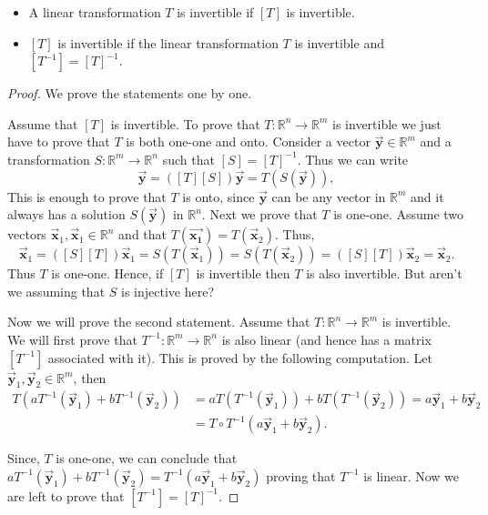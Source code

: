 \documentclass[12pt]{article}
\theoremstyle{remark}
\let\oldvec = \vec
\renewcommand{\vec}[1]{\oldvec{\mathbf{#1}}}
\numberwithin{equation}{section}
\begin{document}
\begin{itemize}
	\item A linear transformation $ T $ is invertible if $ [T] $ is invertible. 
	\item $ [T] $ is invertible if the linear transformation $ T $ is invertible and $ [T^{-1}] = [T]^{-1} $.
\end{itemize}

\begin{proof}
    We prove the statements one by one. \par
    Assume that $ [T] $ is invertible. To prove that $ T : \mathbb{R}^n \rightarrow \mathbb{R}^m $ is invertible we just have to prove that $ T $ is both one-one and onto. Consider a vector $ \vec{y} \in \mathbb{R}^m $ and a transformation $ S : \mathbb{R}^m \rightarrow \mathbb{R}^n $ such that $ [S] = [T]^{-1} $. Thus we can write
    \begin{equation*}
	    \vec{y} = ([T][S])\vec{y} = T(S(\vec{y})),
    \end{equation*}
    This is enough to prove that $ T $ is onto, since $ \vec{y} $ can be any vector in $ \mathbb{R}^m $ and it always has a solution $ S(\vec{y}) $ in $ \mathbb{R}^n $. Next we prove that $ T $ is one-one. Assume two vectors $ \vec{x}_{1}, \vec{x}_{1} \in \mathbb{R}^n $ and that $ T(\vec{x_{1}}) = T(\vec{x}_{2}) $.  Thus, 
    \begin{equation*}
	    \vec{x}_{1} = ([S][T])\vec{x}_{1} = S(T(\vec{x}_{1})) = S(T(\vec{x}_{2})) = ([S][T])\vec{x}_{2} = \vec{x}_{2}.
    \end{equation*}
    Thus $ T $ is one-one. Hence, if $ [T] $ is invertible then $ T $ is also invertible. But aren't we assuming that $ S $ is injective here? \par
    Now we will prove the second statement. Assume that $ T : \mathbb{R}^n \rightarrow \mathbb{R}^m $ is invertible. We will first prove that $ T^{-1} : \mathbb{R}^m \rightarrow \mathbb{R}^n $ is also linear (and hence has a matrix $ [T^{-1}] $ associated with it). This is proved by the following computation. Let $ \vec{y}_{1}, \vec{y}_{2} \in \mathbb{R}^m $, then
    \begin{align*}
	    T(a T^{-1}(\vec{y}_{1}) + b T^{-1}(\vec{y}_{2})) 
	    &= aT(T^{-1}(\vec{y}_{1})) + bT(T^{-1}(\vec{y}_{2}))
	     = a \vec{y}_{1} + b \vec{y}_{2} \\ 
	    &= T \circ T^{-1} (a \vec{y}_{1} + b \vec{y}_{2}).
    \end{align*}
   
    Since, $ T $ is one-one, we can conclude that $ a T^{-1}(\vec{y}_{1}) + b T^{-1}(\vec{y}_{2}) = T^{-1}(a \vec{y}_{1} + b \vec{y}_{2}) $ proving that $ T^{-1} $ is linear. Now we are left to prove that $ [T^{-1}] = [T]^{-1} $.
	
\end{proof}
\end{document}

